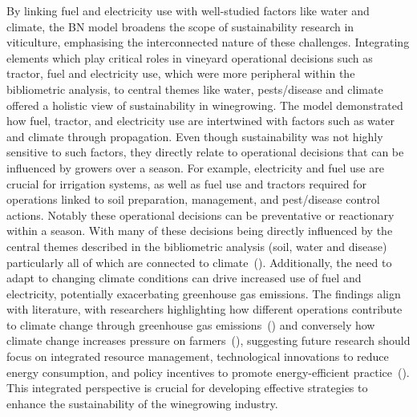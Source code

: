 \documentclass[fleqn,10pt]{wlscirep}
\begin{document}
By linking fuel and electricity use with well-studied factors like water and climate, the BN model broadens the scope of sustainability research in viticulture, emphasising the interconnected nature of these challenges. Integrating elements which play critical roles in vineyard operational decisions such as tractor, fuel and electricity use, which were more peripheral within the bibliometric analysis, to central themes like water, pests/disease and climate offered a holistic view of sustainability in winegrowing. The model demonstrated how fuel, tractor, and electricity use are intertwined with factors such as water and climate through propagation. Even though sustainability was not highly sensitive to such factors, they directly relate to operational decisions that can be influenced by growers over a season. For example, electricity and fuel use are crucial for irrigation systems, as well as fuel use and tractors required for operations linked to soil preparation, management, and pest/disease control actions. Notably these operational decisions can be preventative or reactionary within a season. With many of these decisions being directly influenced by the central themes described in the bibliometric analysis (soil, water and disease) particularly all of which are connected to climate~(\cite{fragaClimateChangeNew2020,tofaloClimateChangeWine2023,naigeonDATADecisionmakingViticulture2023}). Additionally, the need to adapt to changing climate conditions can drive increased use of fuel and electricity, potentially exacerbating greenhouse gas emissions. The findings align with literature, with researchers highlighting how different operations contribute to climate change through greenhouse gas emissions~(\cite{pilafidisAssessingEnergyUse2023,cechPesticideUseAssociated2022,zhangEstimatingEconomicEnvironmental2019}) and conversely how climate change increases pressure on farmers~(\cite{barnaEditorialImprovingSustainability2023,costaRoleSoilTemperature2023,atakClimateChangeAdaptive2024}), suggesting future research should focus on integrated resource management, technological innovations to reduce energy consumption, and policy incentives to promote energy-efficient practice~(\cite{pereiraViticultureClimateChange2023}). This integrated perspective is crucial for developing effective strategies to enhance the sustainability of the winegrowing industry.
\end{document}
